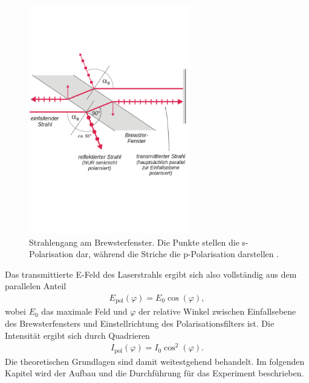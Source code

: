 \begin{figure}[H]
  \centering
  \includegraphics[height = 10.0cm]{Pics von Buddy/brewster.png}
  \caption{Strahlengang am Brewsterfenster. Die Punkte stellen die s-Polarisation dar, während die
  Striche die p-Polarisation darstellen \cite{goettingen}.}
  \label{fig:brewster}
\end{figure}

Das transmittierte E-Feld des Laserstrahls ergibt sich also
vollständig aus dem parallelen Anteil
\begin{align}
  E_{\text{pol}}(\varphi) = E_0 \cos(\varphi),
\end{align}
wobei $E_0$ das maximale Feld und $\varphi$ der relative Winkel zwischen Einfallsebene des Brewsterfensters
und Einstellrichtung des Polarisationsfilters ist. Die Intensität ergibt sich durch Quadrieren
\begin{align}
  I_{\text{pol}}(\varphi) = I_0 \cos^2(\varphi).
\end{align}
Die theoretischen Grundlagen sind damit weitestgehend behandelt. Im folgenden Kapitel
wird der Aufbau und die Durchführung für das Experiment beschrieben.

